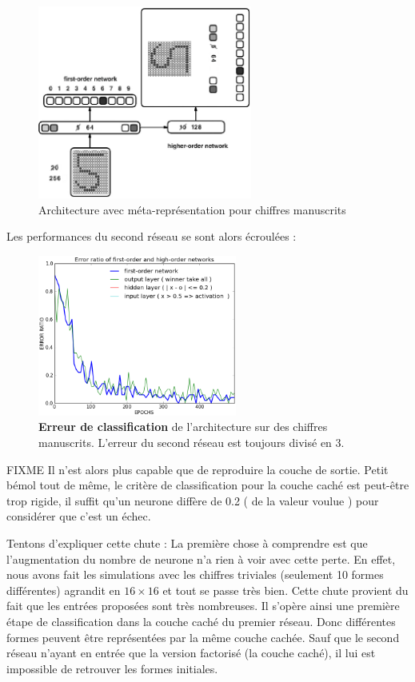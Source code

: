 \documentclass[a4paper,12pt, twoside]{article}
\begin{document}
\begin{figure}[H]
\begin{center}
 \includegraphics[height=240px]{../cleeremans_2007/digit_reco/schema_handwritten.png}
\end{center}
\caption{ Architecture avec méta-représentation pour chiffres manuscrits}
\end{figure}

Les performances du second réseau se sont alors écroulées : 
\begin{figure}[H]
\begin{center}
 \includegraphics[height=200px]{../cleeremans_2007/digit_reco/err_handwritten.png}
\end{center}
\caption{ \textbf{Erreur de classification} de l'architecture sur des chiffres manuscrits.
L'erreur du second réseau est toujours divisé en 3.}
\end{figure}
FIXME
Il n'est alors plus capable que de reproduire la couche de sortie. Petit bémol tout de même,
le critère de classification pour la couche caché est peut-être trop rigide, il suffit qu'un
neurone diffère de 0.2 ( de la valeur voulue ) pour considérer que c'est un échec.


Tentons d'expliquer cette chute :
\newline La première chose à comprendre est que l'augmentation
du nombre de neurone n'a rien à voir avec cette perte. En effet, nous avons fait les 
simulations avec les chiffres triviales (seulement 10 formes différentes) agrandit en $16 \times 16$
et tout se passe très bien.
\newline
Cette chute provient du fait que les entrées proposées sont très nombreuses. Il s'opère ainsi
une première étape de classification dans la couche caché du premier réseau.
Donc différentes formes peuvent être représentées par la même couche cachée.
Sauf que le second réseau n'ayant en entrée que la version factorisé (la couche caché), il lui 
est impossible de retrouver les formes initiales.
\end{document}
